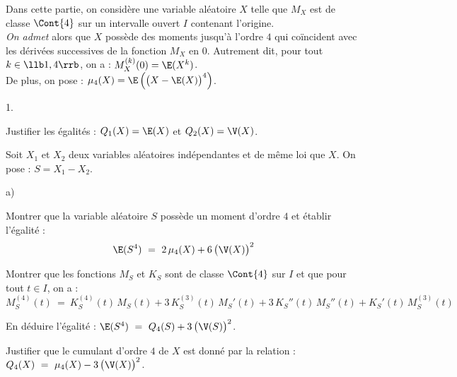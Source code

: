\documentclass[11pt]{article}%
\begin{document}
\noindent
Dans cette partie, on considère une variable aléatoire $X$ telle que
$M_X$ est de classe $\Cont{4}$ sur un intervalle ouvert $I$ contenant
l'origine.\\
{\it On admet} alors que $X$ possède des moments jusqu'à l'ordre $4$
qui coïncident avec les dérivées successives de la fonction $M_X$ en
$0$. Autrement dit, pour tout $k \in \llb 1,4 \rrb$, on a :
$M_X^{(k)}(0) = \E(X^k)$.\\[.1cm]
De plus, on pose : $\mu_4(X) = \E\left( \big(X - \E(X)\big)^4\right)$.
\begin{noliste}{1.}
  \setlength{\itemsep}{4mm}
  \setcounter{enumi}{11}
\item Justifier les égalités : $Q_1(X) = \E(X)$ et $Q_2(X) = \V(X)$.
  
\item Soit $X_1$ et $X_2$ deux variables aléatoires indépendantes et
  de même loi que $X$. On pose : $S = X_1 - X_2$.
  \begin{noliste}{a)}
    \setlength{\itemsep}{2mm}
  \item Montrer que la variable aléatoire $S$ possède un moment
    d'ordre $4$ et établir l'égalité :
    \[
      \E(S^4) \ = \ 2 \, \mu_4(X) + 6 \, \big(\V(X)\big)^2
    \]
    
  \item Montrer que les fonctions $M_S$ et $K_S$ sont de classe
    $\Cont{4}$ sur $I$ et que pour tout $t \in I$, on a :
    \[
      M_S^{(4)}(t) \ = \ K_S^{(4)}(t) \, M_S(t) + 3 \, K_S^{(3)}(t) \,
      M_S'(t) + 3 \, K_S''(t) \, M_S''(t) + K_S'(t) \, M_S^{(3)}(t)
    \]
    
  \item En déduire l'égalité : $\E(S^4) \ = \ Q_4(S) + 3 \, \big(\V(S)\big)^2$.
  \end{noliste}
  
\item Justifier que le cumulant d'ordre $4$ de $X$ est donné par la
  relation : $Q_4(X) \ = \ \mu_4(X) - 3 \, \big(\V(X)\big)^2$.
\end{noliste}
\end{document}
